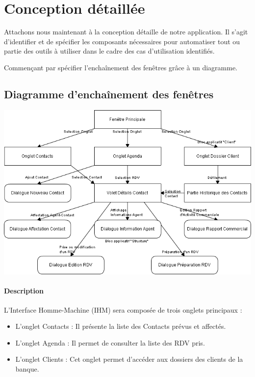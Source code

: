 
\section{Conception détaillée}

Attachons nous maintenant à la conception détaille de notre application. Il s'agit
d'identifier et de spécifier les composants nécessaires pour automatiser tout ou
partie des outils à utiliser dans le cadre des cas d'utilisation identifiés.

Commençant par spécifier l'enchaînement des fenêtres grâce à un diagramme.

\subsection{Diagramme d'enchaînement des fenêtres}

\begin {center}
\includegraphics[width=\textwidth]{diagramme-edf.png}
\end {center}

\paragraph{Description}

L'Interface Homme-Machine (IHM) sera composée de trois onglets
principaux :

\begin{itemize}
\item L'onglet Contacts : Il présente la liste des Contacts prévus et affectés.
\item L'onglet Agenda : Il permet de consulter la liste des RDV pris.
\item L'onglet Clients : Cet onglet permet d'accéder aux dossiers des clients de la banque.
\end{itemize}

